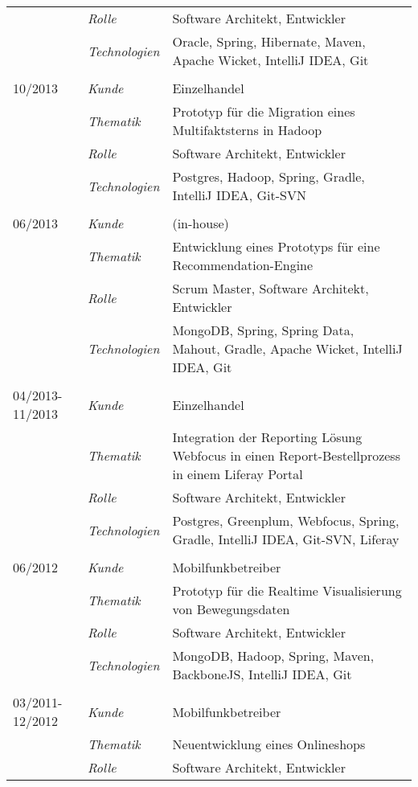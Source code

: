 \begin{longtable}{@{}>{}p{4cm}>{\itshape}p{2cm}>{}p{9cm}}
\nopagebreak		& Rolle 	    & Software Architekt, Entwickler\\
\nopagebreak		& Technologien	& Oracle, Spring, Hibernate, Maven, Apache Wicket, IntelliJ IDEA, Git\\
\\
10/2013             & Kunde 	    & Einzelhandel\\
\nopagebreak		& Thematik	    & Prototyp für die Migration eines Multifaktsterns in Hadoop\\
\nopagebreak		& Rolle 	    & Software Architekt, Entwickler\\
\nopagebreak		& Technologien	& Postgres, Hadoop, Spring, Gradle, IntelliJ IDEA, Git-SVN\\
\\
06/2013             & Kunde 	    & (in-house)\\
\nopagebreak		& Thematik	    & Entwicklung eines Prototyps für eine Recommendation-Engine\\
\nopagebreak		& Rolle 	    & Scrum Master, Software Architekt, Entwickler\\
\nopagebreak		& Technologien	& MongoDB, Spring, Spring Data, Mahout, Gradle, Apache Wicket, IntelliJ IDEA, Git\\
\\
04/2013-11/2013     & Kunde 	    & Einzelhandel\\
\nopagebreak		& Thematik	    & Integration der Reporting Lösung Webfocus in einen Report-Bestellprozess in einem Liferay Portal\\
\nopagebreak		& Rolle 	    & Software Architekt, Entwickler\\
\nopagebreak		& Technologien	& Postgres, Greenplum, Webfocus, Spring, Gradle, IntelliJ IDEA, Git-SVN, Liferay\\
\\
06/2012             & Kunde 	    & Mobilfunkbetreiber\\
\nopagebreak		& Thematik	    & Prototyp für die Realtime Visualisierung von Bewegungsdaten \\
\nopagebreak		& Rolle 	    & Software Architekt, Entwickler\\
\nopagebreak		& Technologien	& MongoDB, Hadoop, Spring, Maven, BackboneJS, IntelliJ IDEA, Git\\
\\
03/2011-12/2012     & Kunde 	    & Mobilfunkbetreiber\\
\nopagebreak		& Thematik	    & Neuentwicklung eines Onlineshops \\
\nopagebreak		& Rolle 	    & Software Architekt, Entwickler\\

\end{longtable}
